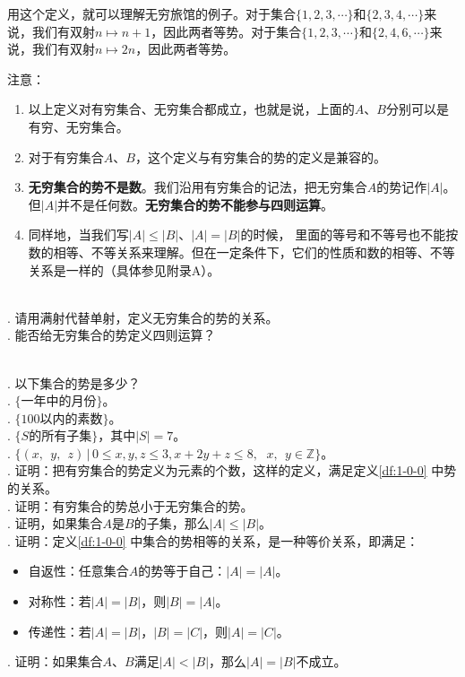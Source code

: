\documentclass[12pt,UTF8,fontset=none]{ctexbook}
\begin{document}
用这个定义，就可以理解无穷旅馆的例子。对于集合$\{1,2,3,\cdots\}$和$\{2,3,4,\cdots\}$来说，我们有双射$n\mapsto n+1$，因此两者等势。对于集合$\{1,2,3,\cdots\}$和$\{2,4,6,\cdots\}$来说，我们有双射$n\mapsto 2n$，因此两者等势。

注意：
\begin{enumerate}
    \item 以上定义对有穷集合、无穷集合都成立，也就是说，上面的$A$、$B$分别可以是有穷、无穷集合。
    \item 对于有穷集合$A$、$B$，这个定义与有穷集合的势的定义是兼容的。
    \item \textbf{无穷集合的势不是数}。我们沿用有穷集合的记法，把无穷集合$A$的势记作$|A|$。
    但$|A|$并不是任何数。\textbf{无穷集合的势不能参与四则运算}。
    \item 同样地，当我们写$|A| \leqslant |B|$、$|A| = |B|$的时候，
    里面的等号和不等号也不能按数的相等、不等关系来理解。但在一定条件下，它们的性质和数的相等、不等关系是一样的（具体参见附录A）。
\end{enumerate}

\begin{sk}
    \mbox{} \\
    . 请用满射代替单射，定义无穷集合的势的关系。\\
    . 能否给无穷集合的势定义四则运算？
\end{sk}

\begin{xt}
    \mbox{} \\
    . 以下集合的势是多少？\\
    . $\{\mbox{一年中的月份}\}$。\\ 
    . $\{100\mbox{以内的素数}\}$。\\ 
    . $\{S\mbox{的所有子集}\}$，其中$|S| = 7$。\\ 
    . $\{(x, \;\, y, \;\, z) \, | \, 0 \leqslant x, y, z \leqslant 3, x + 2y + z \leqslant 8,\,\;\, x,\;\, y \in  \mathbb{Z}\}$。\\ 
    . 证明：把有穷集合的势定义为元素的个数，这样的定义，满足定义\ref{df:1-0-0} 中势的关系。\\
    . 证明：有穷集合的势总小于无穷集合的势。\\
    . 证明，如果集合$A$是$B$的子集，那么$|A| \leqslant |B|$。\\
    . 证明：定义\ref{df:1-0-0} 中集合的势相等的关系，是一种等价关系，即满足：
    \indent \begin{itemize}
        \item 自返性：任意集合$A$的势等于自己：$|A| = |A|$。
        \item 对称性：若$|A| = |B|$，则$|B| = |A|$。
        \item 传递性：若$|A| = |B|$，$|B| = |C|$，则$|A| = |C|$。
    \end{itemize}

    . 证明：如果集合$A$、$B$满足$|A| < |B|$，那么$|A| = |B|$不成立。

\end{xt}
\end{document}
